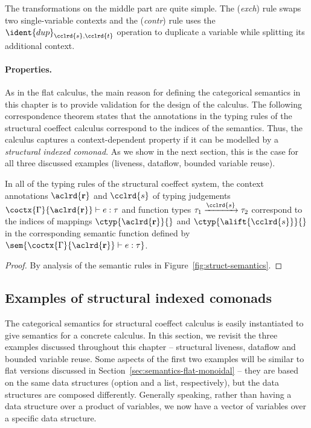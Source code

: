 The transformations on the middle part are quite simple. The (\emph{exch}) rule swaps two
single-variable contexts and the (\emph{contr}) rule uses the $\ident{dup}_{\cclrd{s}, \cclrd{t}}$
operation to duplicate a variable while splitting its additional context.

\paragraph{Properties.}

As in the flat calculus, the main reason for defining the categorical semantics in this chapter
is to provide validation for the design of the calculus. The following correspondence theorem
states that the annotations in the typing rules of the structural coeffect calculus correspond
to the indices of the semantics. Thus, the calculus captures a context-dependent property if
it can be modelled by a \emph{structural indexed comonad}. As we show in the next section,
this is the case for all three discussed examples (liveness, dataflow, bounded variable reuse).

\begin{theorem}[Correspondence]
\label{thm:struct-correspondence}
In all of the typing rules of the structural coeffect system, the context annotations $\aclrd{\textbf{r}}$
and $\cclrd{s}$ of typing judgements $\coctx{\Gamma}{\aclrd{\textbf{r}}} \vdash e : \tau$ and function types
$\tau_1 \xrightarrow{\cclrd{s}} \tau_2$  correspond to the indices of mappings $\ctyp{\aclrd{\textbf{r}}}{}$
and $\ctyp{\alift{\cclrd{s}}}{}$ in the corresponding semantic function defined
by $\sem{\coctx{\Gamma}{\aclrd{\textbf{r}}} \vdash e : \tau}$.
\end{theorem}
\begin{proof}
By analysis of the semantic rules in Figure~\ref{fig:struct-semantics}.
\end{proof}


\subsection{Examples of structural indexed comonads}
\label{sec:struct-semantics-examples}

The categorical semantics for structural coeffect calculus is easily instantiated to give
semantics for a concrete calculus. In this section, we revisit the three examples discussed
throughout this chapter -- structural liveness, dataflow and bounded variable reuse.
Some aspects of the first two examples will be similar to flat versions discussed in
Section~\ref{sec:semantics-flat-monoidal} -- they are based on the same data structures (option and a
list, respectively), but the data structures are composed differently. Generally speaking,
rather than having a data structure over a product of variables, we now have
a vector of variables over a specific data structure.

